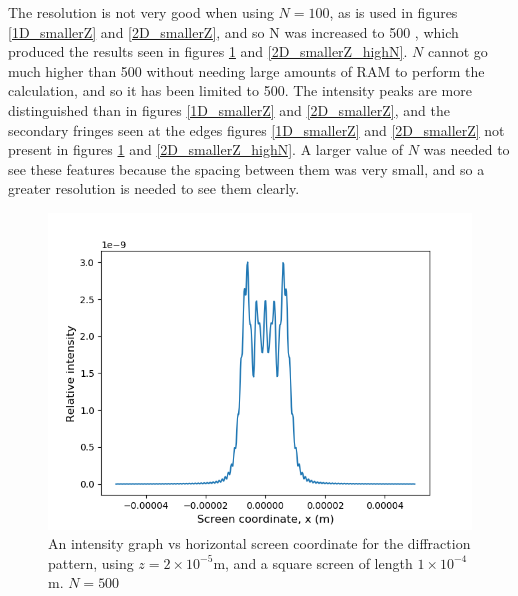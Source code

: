 \documentclass[twocolumn,prl,nobalancelastpage,aps,10pt]{revtex4-1}
\begin{document}
The resolution is not very good when using $N=100$, as is used in figures \ref{1D_smallerZ} and \ref{2D_smallerZ}, and so N was increased to 500 , which produced the results seen in figures \ref{1D_smallerZ_highN} and \ref{2D_smallerZ_highN}. $N$ cannot go much higher than 500 without needing large amounts of RAM to perform the calculation, and so it has been limited to 500. The intensity peaks are more distinguished than in figures \ref{1D_smallerZ} and \ref{2D_smallerZ}, and the secondary fringes seen at the edges figures \ref{1D_smallerZ} and \ref{2D_smallerZ} not present in figures \ref{1D_smallerZ_highN} and \ref{2D_smallerZ_highN}. A larger value of $N$ was needed to see these features because the spacing between them was very small, and so a greater resolution is needed to see them clearly.

\begin{figure}[!ht]
	\includegraphics*[width=0.96\linewidth,clip]{1D_z2e-5_N500}
	\caption{An intensity graph vs horizontal screen coordinate for the diffraction pattern, using $z = 2\times10^{-5}$m, and a square screen of length $1\times10^{-4}$m. $N=500$} \label{1D_smallerZ_highN}
\end{figure}
\end{document}
